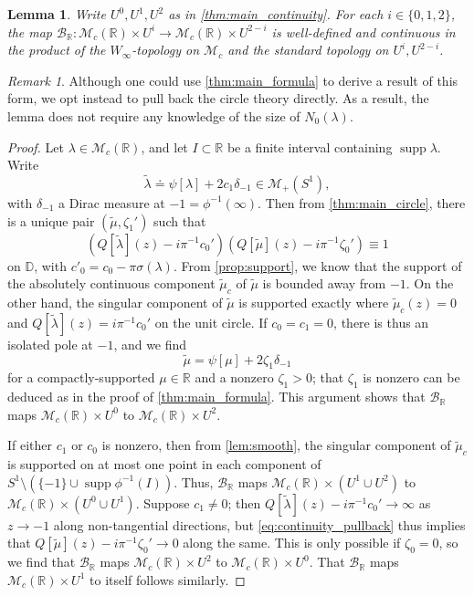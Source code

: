 \documentclass{cams-l} %
\newcommand{\RR}{\mathbb R}
\newcommand{\DD}{\mathbb D}
\newcommand{\cM}{\mathcal M}
\newcommand{\cB}{\mathcal B}
\newcommand{\supp}{\operatorname{supp}}
\newtheorem{lemma}[theorem]{Lemma}
\theoremstyle{definition}
\theoremstyle{remark}
\newtheorem{remark}[theorem]{Remark}
\numberwithin{equation}{section}
\begin{document}
\begin{lemma}\label{lem:compactcontinuity}
    Write $U^{0},U^1,U^2$ as in \cref{thm:main_continuity}. For each $i\in\{0,1,2\}$, the map $\cB_\RR:\cM_c(\RR)\times U^i\to\cM_c(\RR)\times U^{2-i}$ is well-defined and continuous in the product of the $W_\infty$-topology on $\cM_c$ and the standard topology on $U^i,U^{2-i}$.
\end{lemma}
\begin{remark}
    Although one could use \cref{thm:main_formula} to derive a result of this form, we opt instead to pull back the circle theory directly. As a result, the lemma does not require any knowledge of the size of $N_0(\lambda)$.
\end{remark}
\begin{proof}
    Let $\lambda\in\cM_c(\RR)$, and let $I\subset\RR$ be a finite interval containing $\supp\lambda$. Write
    \[\widetilde{\lambda} \doteq \psi[\lambda] + 2c_1\delta_{-1}\in\cM_+(S^1),\]
    with $\delta_{-1}$ a Dirac measure at $-1=\phi^{-1}(\infty)$. Then from \cref{thm:main_circle}, there is a unique pair $(\widetilde{\mu},\zeta_1')$ such that
    \begin{equation}\label{eq:continuity_pullback}
        (Q[\widetilde{\lambda}](z) - i\pi^{-1}c_0')(Q[\widetilde{\mu}](z) - i\pi^{-1}\zeta_0') \equiv 1
    \end{equation}
    on $\DD$, with $c'_0 = c_0-\pi\sigma(\lambda)$. From \cref{prop:support}, we know that the support of the absolutely continuous component $\widetilde{\mu}_c$ of $\widetilde{\mu}$ is bounded away from $-1$. On the other hand, the singular component of $\widetilde{\mu}$ is supported exactly where $\widetilde{\mu}_c(z)=0$ and $Q[\widetilde{\lambda}](z) = i\pi^{-1}c_0'$ on the unit circle. If $c_0=c_1=0$, there is thus an isolated pole at $-1$, and we find
    \[\widetilde{\mu} = \psi[\mu] + 2\zeta_1\delta_{-1}\]
    for a compactly-supported $\mu\in\RR$ and a nonzero $\zeta_1>0$; that $\zeta_1$ is nonzero can be deduced as in the proof of \cref{thm:main_formula}. This argument shows that $\cB_\RR$ maps $\cM_c(\RR)\times U^0$ to $\cM_c(\RR)\times U^{2}$. 
    
    If either $c_1$ or $c_0$ is nonzero, then from \cref{lem:smooth}, the singular component of $\widetilde{\mu}_c$ is supported on at most one point in each component of $S^1\setminus\left(\{-1\}\cup\supp\phi^{-1}(I)\right)$. Thus, $\cB_\RR$ maps $\cM_c(\RR)\times(U^1\cup U^2)$ to $\cM_c(\RR)\times(U^0\cup U^1)$. Suppose $c_1\neq 0$; then $Q[\widetilde{\lambda}](z) - i\pi^{-1}c_0'\to \infty$ as $z\to-1$ along non-tangential directions, but \cref{eq:continuity_pullback} thus implies that $Q[\widetilde{\mu}](z) - i\pi^{-1}\zeta_0'\to 0$ along the same. This is only possible if $\zeta_0=0$, so we find that $\cB_\RR$ maps $\cM_c(\RR)\times U^2$ to $\cM_c(\RR)\times U^0$. That $\cB_\RR$ maps $\cM_c(\RR)\times U^1$ to itself follows similarly.


\end{proof}
\end{document}
